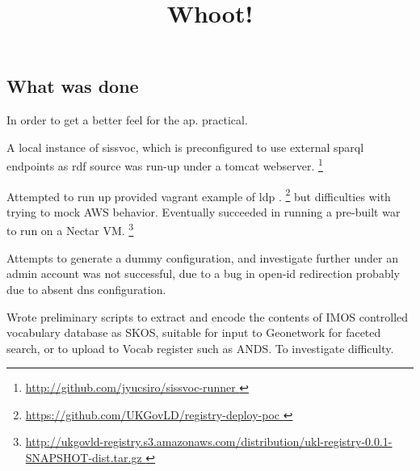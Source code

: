 \documentclass[10pt,a4paper]{article}
\title{Whoot!}
\date{}
\newenvironment{italicquotes}
{\begin{quote}\itshape}
{\end{quote}}
\let\Item\item
\newcommand\SpecialItem{\renewcommand\item[1][]{\Item[\textbullet~\bfseries##1]}}
\begin{document}
\SpecialItem

  \maketitle
    \begin{flushleft}
  \setlength{\parindent}{5ex}

% 
% 




\section{
  What was done
}

  In order to get a better feel for the ap. practical. 

  \item[] A local instance of sissvoc, which is preconfigured to use
  external sparql endpoints as rdf source was run-up under a tomcat webserver.
  \footnote{ \url { http://github.com/jyucsiro/sissvoc-runner }  } 

  \item[] Attempted to run up provided vagrant example of ldp .
  \footnote{ \url { https://github.com/UKGovLD/registry-deploy-poc } } but
  difficulties with trying to mock AWS behavior. Eventually succeeded in running a pre-built war 
  to run on a Nectar VM. 
  \footnote{ \url { 
  http://ukgovld-registry.s3.amazonaws.com/distribution/ukl-registry-0.0.1-SNAPSHOT-dist.tar.gz
  }}

  Attempts to generate a dummy configuration, and investigate further under an
  admin account was not successful, due to a bug in open-id redirection probably
  due to absent dns configuration.

  \item[] 
  Wrote preliminary scripts to extract and encode the contents of IMOS
  controlled vocabulary database as SKOS, suitable for input to Geonetwork 
  for faceted search, or to upload to Vocab register such as ANDS.
  To investigate difficulty.





\end{flushleft}
\end{document}
